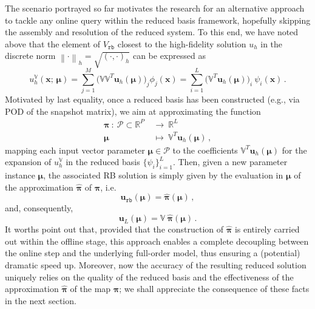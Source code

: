\documentclass[12pt, a4paper, twoside, openright]{report}
\numberwithin{equation}{chapter}
\theoremstyle{theorem}
\theoremstyle{definition}
\theoremstyle{remark}
\theoremstyle{proposition}
\numberwithin{figure}{chapter}
\newcommand{\norm}[1]{\left\lVert#1\right\rVert}
\newcommand{\bg}[1]{\boldsymbol{#1}}
\begin{document}
		\vspace*{0.15cm}
									
		The scenario portrayed so far motivates the research for an alternative approach to tackle any online query within the reduced basis framework, hopefully skipping the assembly and resolution of the reduced system. To this end, we have noted above that the element of $V_{\texttt{rb}}$ closest to the high-fidelity solution $u_h$ in the discrete norm $\norm{\cdot}_h = \sqrt{(\cdot,\cdot)_h}$ can be expressed as
		\begin{equation}
			\label{eq:high-fidelity-projected}
			u^{\mathbb{V}}_h(\bg{x}; \, \bg{\mu}) = \sum_{j = 1}^M \big( \mathbb{V} \mathbb{V}^T \mathbf{u}_h(\bg{\mu}) \big)_j \phi_j(\bg{x}) = \sum_{i = 1}^L \big( \mathbb{V}^T \mathbf{u}_h(\bg{\mu}) \big)_i ~ \psi_i(\bg{x}) \, .
		\end{equation} 
		Motivated by last equality, once a reduced basis has been constructed (e.g., via POD of the snapshot matrix), we aim at approximating the function
		\begin{equation}
			\label{eq:map-to-approximate}
			\begin{aligned}
				\bg{\pi} ~ : ~ \mathcal{P} \subset \mathbb{R}^P ~ & \rightarrow ~ \mathbb{R}^L \\
				\bg{\mu} ~ & \mapsto ~ \mathbb{V}^T \mathbf{u}_h(\bg{\mu}) \, ,
			\end{aligned}
		\end{equation}
		mapping each input vector parameter $\bg{\mu} \in \mathcal{P}$ to the coefficients $\mathbb{V}^T \mathbf{u}_h(\bg{\mu})$ for the expansion of $u^{\mathbb{V}}_h$ in the reduced basis $\big\lbrace \psi_i \big\rbrace_{i = 1}^L$. Then, given a new parameter instance $\bg{\mu}$, the associated RB solution is simply given by the evaluation in $\bg{\mu}$ of the approximation $\hat{\bg{\pi}}$ of $\bg{\pi}$, i.e.
		\begin{equation}
			\mathbf{u}_{\texttt{rb}}(\bg{\mu}) = \hat{\bg{\pi}}(\bg{\mu}) \, ,
		\end{equation}
		and, consequently,
		\begin{equation}
			\mathbf{u}_L(\bg{\mu}) = \mathbb{V} ~ \hat{\bg{\pi}}(\bg{\mu}) \, .
		\end{equation}
		It worths point out that, provided that the construction of $\hat{\bg{\pi}}$ is entirely carried out within the offline stage, this approach enables a complete decoupling between the online step and the underlying full-order model, thus ensuring a (potential) dramatic speed up. Moreover, now the accuracy of the resulting reduced solution uniquely relies on the quality of the reduced basis and the effectiveness of the approximation $\hat{\bg{\pi}}$ of the map $\bg{\pi}$; we shall appreciate the consequence of these facts in the next section.
		
\end{document}
